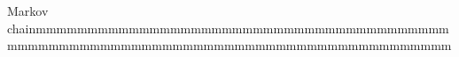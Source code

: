 \documentclass[preview]{standalone}
\begin{document}
\begin{center}
Markov chainmmmmmmmmmmmmmmmmmmmmmmmmmmmmmmmmmmmmmmmmmmmmmmmmmmmmmmmmmmmmmmmmmmmmmmmmmmmmmmmmmmm
\end{center}
\end{document}
